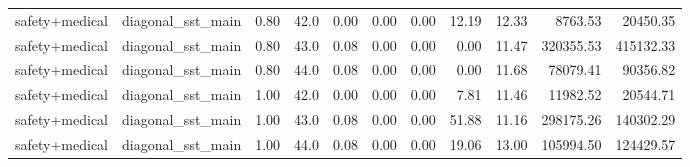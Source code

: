 \begin{table}[H]
{\begin{tabular}{llllrrrrrrr}
safety+medical & diagonal\_sst\_main & 0.80 & 42.0 & 0.00 & 0.00 & 0.00 & 12.19 & 12.33 & 8763.53 & 20450.35 \\
safety+medical & diagonal\_sst\_main & 0.80 & 43.0 & 0.08 & 0.00 & 0.00 & 0.00 & 11.47 & 320355.53 & 415132.33 \\
safety+medical & diagonal\_sst\_main & 0.80 & 44.0 & 0.08 & 0.00 & 0.00 & 0.00 & 11.68 & 78079.41 & 90356.82 \\
safety+medical & diagonal\_sst\_main & 1.00 & 42.0 & 0.00 & 0.00 & 0.00 & 7.81 & 11.46 & 11982.52 & 20544.71 \\
safety+medical & diagonal\_sst\_main & 1.00 & 43.0 & 0.08 & 0.00 & 0.00 & 51.88 & 11.16 & 298175.26 & 140302.29 \\
safety+medical & diagonal\_sst\_main & 1.00 & 44.0 & 0.08 & 0.00 & 0.00 & 19.06 & 13.00 & 105994.50 & 124429.57 \\
\bottomrule
\end{tabular}
}
\end{table}


